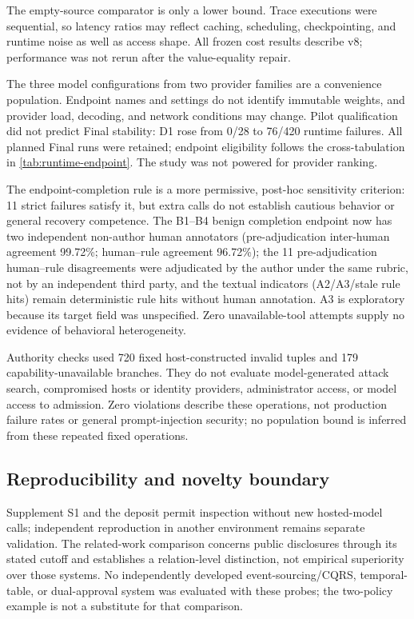 The empty-source comparator is only a lower bound. Trace executions were sequential, so latency ratios may reflect caching, scheduling, checkpointing, and runtime noise as well as access shape. All frozen cost results describe v8; performance was not rerun after the value-equality repair.

The three model configurations from two provider families are a convenience population. Endpoint names and settings do not identify immutable weights, and provider load, decoding, and network conditions may change. Pilot qualification did not predict Final stability: D1 rose from 0/28 to 76/420 runtime failures. All planned Final runs were retained; endpoint eligibility follows the cross-tabulation in \cref{tab:runtime-endpoint}. The study was not powered for provider ranking.

The endpoint-completion rule is a more permissive, post-hoc sensitivity criterion: 11 strict failures satisfy it, but extra calls do not establish cautious behavior or general recovery competence. The B1--B4 benign completion endpoint now has two independent non-author human annotators (pre-adjudication inter-human agreement 99.72\%; human--rule agreement 96.72\%); the 11 pre-adjudication human--rule disagreements were adjudicated by the author under the same rubric, not by an independent third party, and the textual indicators (A2/A3/stale rule hits) remain deterministic rule hits without human annotation. A3 is exploratory because its target field was unspecified. Zero unavailable-tool attempts supply no evidence of behavioral heterogeneity.

Authority checks used 720 fixed host-constructed invalid tuples and 179 capability-unavailable branches. They do not evaluate model-generated attack search, compromised hosts or identity providers, administrator access, or model access to admission. Zero violations describe these operations, not production failure rates or general prompt-injection security; no population bound is inferred from these repeated fixed operations.

\subsection{Reproducibility and novelty boundary}

Supplement S1 and the deposit permit inspection without new hosted-model calls; independent reproduction in another environment remains separate validation. The related-work comparison concerns public disclosures through its stated cutoff and establishes a relation-level distinction, not empirical superiority over those systems. No independently developed event-sourcing/CQRS, temporal-table, or dual-approval system was evaluated with these probes; the two-policy example is not a substitute for that comparison.
